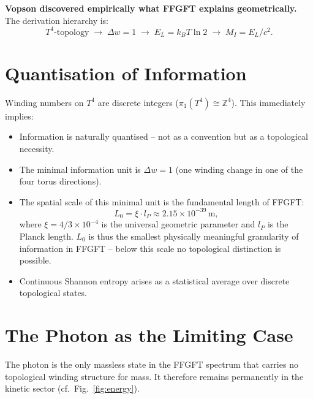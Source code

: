 \textbf{Vopson discovered empirically what FFGFT explains geometrically.}
The derivation hierarchy is:
\begin{equation}
  T^4\text{-topology} \;\longrightarrow\;
  \Delta w = 1 \;\longrightarrow\;
  E_L = k_B T \ln 2 \;\longrightarrow\;
  M_I = E_L / c^2.
\end{equation}

\section{Quantisation of Information}

Winding numbers on \(T^4\) are discrete integers
(\(\pi_1(T^4) \cong \mathbb{Z}^4\)).
This immediately implies:

\begin{itemize}
  \item Information is naturally quantised --
        not as a convention but as a topological necessity.
  \item The minimal information unit is \(\Delta w = 1\)
        (one winding change in one of the four torus directions).
  \item The spatial scale of this minimal unit is the
        fundamental length of FFGFT:
        \begin{equation}
          L_0 = \xi \cdot l_P \approx 2.15 \times 10^{-39}\,\text{m},
        \end{equation}
        where \(\xi = 4/3 \times 10^{-4}\) is the universal geometric
        parameter and \(l_P\) is the Planck length.
        \(L_0\) is thus the smallest physically meaningful
        granularity of information in FFGFT -- below this scale
        no topological distinction is possible.
  \item Continuous Shannon entropy arises as a statistical
        average over discrete topological states.
\end{itemize}

\section{The Photon as the Limiting Case}

The photon is the only massless state in the FFGFT spectrum that
carries no topological winding structure for mass.
It therefore remains permanently in the kinetic sector
(cf.\ Fig.~\ref{fig:energy}).

